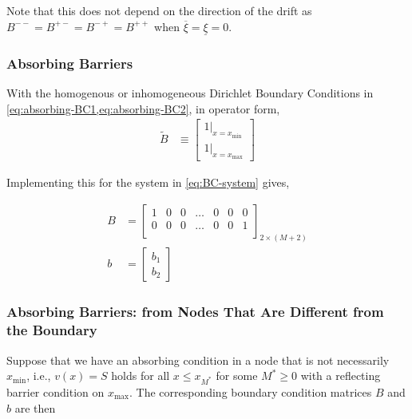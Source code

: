 \documentclass[11pt]{article}
\theoremstyle{definition}
\begin{document}
Note that this does not depend on the direction of the drift as $B^{--} = B^{+-} = B^{-+} = B^{++}$ when $\overline{\xi} = \underline{\xi} = 0$.

	\subsubsection{Absorbing Barriers}

With the homogenous or inhomogeneous Dirichlet Boundary Conditions in \cref{eq:absorbing-BC1,eq:absorbing-BC2}, in operator form,
\begin{align}
	\tilde{B} &\equiv \begin{bmatrix}
	1 \vert_{x = x_{\min}}\\
	1 \vert_{x = x_{\max}}
	\end{bmatrix}
\end{align}

Implementing this for the system in \cref{eq:BC-system} gives,

\begin{align}
B &= \begin{bmatrix}
1 & 0 & 0 & \dots & 0 & 0 & 0 \\
0 & 0 & 0 & \dots & 0 & 0 & 1\\
\end{bmatrix}_{2 \times (M+2)}\label{eq:absorbing-barrier-matrix-regular}\\
b &= \begin{bmatrix}
b_1 \\
b_2
\end{bmatrix}
\end{align}


\subsubsection{Absorbing Barriers: from Nodes That Are Different from the Boundary}
Suppose that we have an absorbing condition in a node that is not necessarily $x_{\min}$, i.e., $v(x) = S$ holds for all $x \leq x_{M^*}$ for some $M^* \geq 0$ with a reflecting barrier condition on $x_{\max}$. The corresponding boundary condition matrices $B$ and $b$ are then
\end{document}
